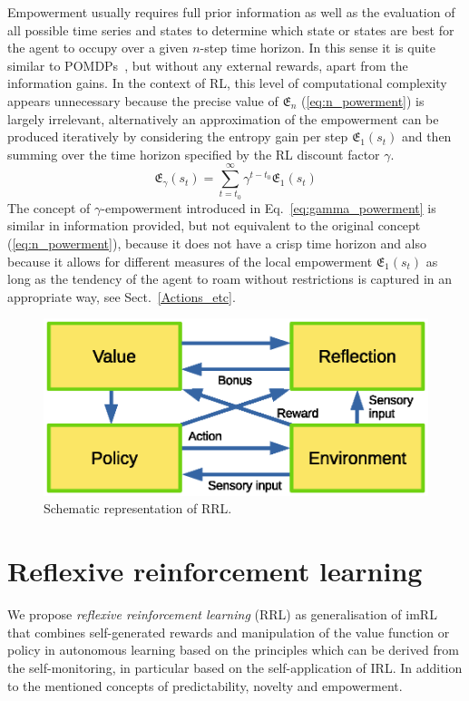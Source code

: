 \documentclass{article}
\begin{document}
Empowerment usually requires full prior information as well as the evaluation of all possible time series and states to determine which state or states are best for the agent to occupy over a given $n$-step time horizon. In this sense it is quite similar to POMDPs~\cite{kaelbling1998planning}, 
but without any external rewards, apart from the information gains.
In the context of RL, this level of computational complexity appears unnecessary because the precise value of $\mathfrak{E}_{n}$ (\ref{eq:n_powerment}) is largely irrelevant, alternatively an approximation of the empowerment can be produced iteratively by considering the entropy gain per step 
$\mathfrak{E}_{1}\left(s_{t}\right)$ and then summing over the time
horizon specified by the RL discount factor $\gamma$.
\begin{equation}
	\mathfrak{E}_{\gamma}\left(s_{t}\right)=\sum_{t=t_0}^\infty
	\gamma^{t-t_0}\mathfrak{E}_{1}\left(s_{t}\right)
	\label{eq:gamma_powerment}
\end{equation}
The concept of $\gamma$-empowerment introduced in 
Eq.~\ref{eq:gamma_powerment} is similar in information provided, but not equivalent to the original 
concept (\ref{eq:n_powerment}), because it does not have a 
crisp time horizon and also because it allows for different 
measures of the local empowerment 
$\mathfrak{E}_{1}\left(s_{t}\right)$ as long as 
the tendency of the agent to roam without restrictions is captured in
an appropriate way, see Sect.~\ref{Actions_etc}.

\begin{figure}[ht] 
\centering
\includegraphics[width=0.45\linewidth]{pics/figure1a.eps}
	\caption{Schematic representation of RRL.\label{rrlfig}}
\end{figure}

\section{Reflexive reinforcement learning} \label{reflexive}
We propose \emph{reflexive reinforcement learning} (RRL) as generalisation of
imRL that combines self-generated rewards and manipulation of the
value function or policy in autonomous learning based on the principles which can be
derived from the self-monitoring, in particular based on the self-application of IRL.
In addition to the mentioned concepts of predictability, novelty and empowerment.
\end{document}
